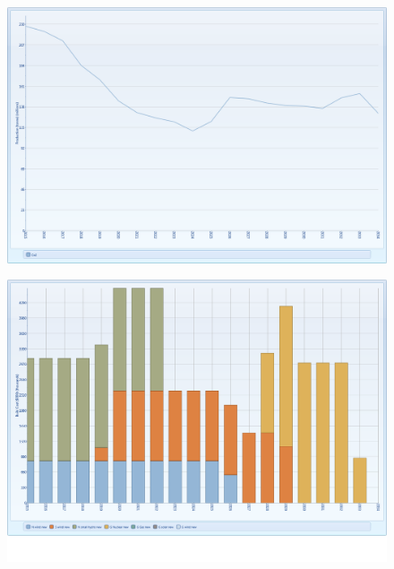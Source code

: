 \documentclass{article}
\begin{document}
\begin{figure}[htbp]
\begin{center}
\includegraphics[width=13cm,keepaspectratio=true]{figures/Expansion/Co2ProductionETGC}
\caption{}
\label{fig:Co2ProductionETGC}
\end{center}
\end{figure}
\begin{figure}[htbp]
\begin{center}
\includegraphics[width=13cm,keepaspectratio=true]{figures/Expansion/GreenCertificate/BuildCostGC}
\caption{}
\label{fig:BuildCostGC}
\end{center}
\end{figure}
\end{document}
